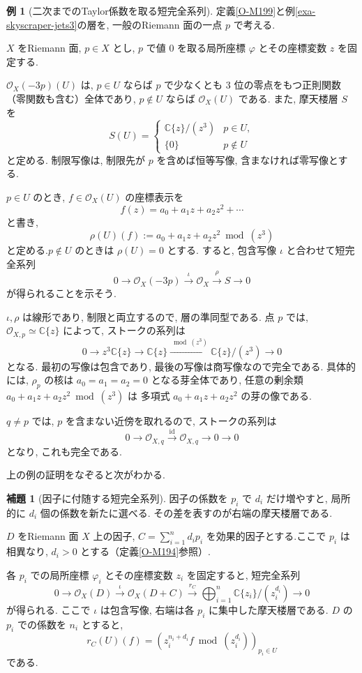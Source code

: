 \documentclass[dvipdfmx,a4paper,11pt]{article} %
\newcommand{\C}{\mathbb{C}}
\theoremstyle{definition}
\numberwithin{equation}{section}
\newtheorem{lem}[thm]{補題}
\newtheorem{exa}[thm]{例}
\begin{document}
\begin{exa}[二次までのTaylor係数を取る短完全系列]\label{exa-third-jet-sequence}
定義\ref{O-M199}と例\ref{exa-skyscraper-jets3}の層を, 一般のRiemann 面の一点 $p$ で考える.

$X$ をRiemann 面, $p\in X$ とし, 
$p$ で値 $0$ を取る局所座標 $\varphi$ とその座標変数 $z$ を固定する.

$\mathcal O_X(-3p)(U)$ は, $p\in U$ ならば
$p$ で少なくとも $3$ 位の零点をもつ正則関数
（零関数も含む）全体であり, 
$p\notin U$ ならば $\mathcal O_X(U)$ である.
また, 摩天楼層 $S$ を
\[
S(U)=
\begin{cases}
\C\{z\}/(z^3) & p\in U,\\
\{0\} & p\notin U
\end{cases}
\]
と定める.
制限写像は, 制限先が $p$ を含めば恒等写像, 
含まなければ零写像とする.

$p\in U$ のとき, $f\in\mathcal O_X(U)$ の座標表示を
\[
f(z)=a_0+a_1z+a_2z^2+\cdots
\]
と書き, 
\[
\rho(U)(f):=a_0+a_1z+a_2z^2\bmod(z^3)
\]
と定める.$p\notin U$ のときは $\rho(U)=0$ とする.
すると, 包含写像 $\iota$ と合わせて短完全系列
\[
0\longrightarrow\mathcal O_X(-3p)
\xrightarrow{\iota}\mathcal O_X
\xrightarrow{\rho}S
\longrightarrow0
\]
が得られることを示そう. 

$\iota,\rho$ は線形であり, 制限と両立するので, 
層の準同型である.
点 $p$ では, $\mathcal O_{X,p}\simeq\C\{z\}$ によって, 
ストークの系列は
\[
0\longrightarrow z^3\C\{z\}
\longrightarrow\C\{z\}
\xrightarrow{\bmod(z^3)}\C\{z\}/(z^3)
\longrightarrow0
\]
となる.
最初の写像は包含であり, 最後の写像は商写像なので完全である.
具体的には, $\rho_p$ の核は
$a_0=a_1=a_2=0$ となる芽全体であり, 
任意の剰余類 $a_0+a_1z+a_2z^2\bmod(z^3)$ は
多項式 $a_0+a_1z+a_2z^2$ の芽の像である.

$q\neq p$ では, $p$ を含まない近傍を取れるので, 
ストークの系列は
\[
0\longrightarrow\mathcal O_{X,q}
\xrightarrow{\mathrm{id}}\mathcal O_{X,q}
\longrightarrow0\longrightarrow0
\]
となり, これも完全である.
\end{exa}

上の例の証明をなぞると次がわかる. 
\begin{lem}[因子に付随する短完全系列]\label{O-M210}
因子の係数を $p_i$ で $d_i$ だけ増やすと, 局所的に $d_i$ 個の係数を新たに選べる. その差を表すのが右端の摩天楼層である.

$D$ をRiemann 面 $X$ 上の因子, 
$C=\sum_{i=1}^n d_i p_i$ を効果的因子とする.ここで $p_i$ は相異なり, $d_i>0$ とする（定義\ref{O-M194}参照）.

各 $p_i$ での局所座標 $\varphi_i$ とその座標変数 $z_i$ を固定すると, 短完全系列
\begin{equation}\label{O-EQ043}
0\longrightarrow\mathcal O_X(D)
\xrightarrow{\iota}\mathcal O_X(D+C)
\xrightarrow{r_C}
\bigoplus_{i=1}^n\C\{z_i\}/(z_i^{d_i})
\longrightarrow0
\end{equation}
が得られる.
ここで $\iota$ は包含写像, 右端は各 $p_i$ に集中した摩天楼層である.
$D$ の $p_i$ での係数を $n_i$ とすると, 
\begin{equation}\label{O-EQ042}
r_C(U)(f)
=
\left(z_i^{n_i+d_i}f\bmod(z_i^{d_i})\right)_{p_i\in U}
\end{equation}
である.
\end{lem}
\end{document}

